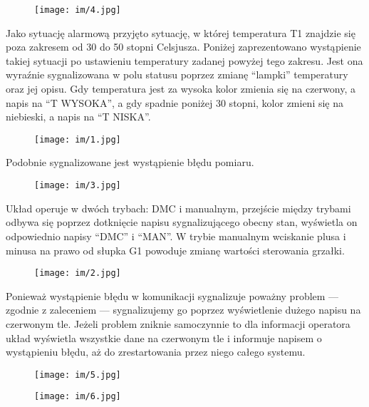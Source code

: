 \begin{figure}[H]
\centering
\texttt{[image: im/4.jpg]}
\label{R4}
\end{figure}


Jako sytuację alarmową przyjęto sytuację, w której temperatura T1 znajdzie się poza zakresem od 30 do 50 stopni Celsjusza. Poniżej zaprezentowano wystąpienie takiej sytuacji po ustawieniu temperatury zadanej powyżej tego zakresu. Jest ona wyraźnie sygnalizowana w polu statusu poprzez zmianę ``lampki'' temperatury oraz jej opisu. Gdy temperatura jest za wysoka kolor zmienia się na czerwony, a napis na ``T WYSOKA'', a gdy spadnie poniżej 30 stopni, kolor zmieni się na niebieski, a napis na ``T NISKA''.


\begin{figure}[H]
\centering
\texttt{[image: im/1.jpg]}
\label{R1}
\end{figure}


Podobnie sygnalizowane jest wystąpienie błędu pomiaru.


\begin{figure}[H]
\centering
\texttt{[image: im/3.jpg]}
\label{R3}
\end{figure}


Układ operuje w dwóch trybach: DMC i manualnym, przejście między trybami odbywa się poprzez dotknięcie napisu sygnalizującego obecny stan, wyświetla on odpowiednio napisy ``DMC'' i ``MAN''. W trybie manualnym wciskanie plusa i minusa na prawo od słupka G1 powoduje zmianę wartości sterowania grzałki.


\begin{figure}[H]
\centering
\texttt{[image: im/2.jpg]}
\label{R2}
\end{figure}


Ponieważ wystąpienie błędu w komunikacji sygnalizuje poważny problem --- zgodnie z zaleceniem --- sygnalizujemy go poprzez wyświetlenie dużego napisu na czerwonym tle. Jeżeli problem zniknie samoczynnie to dla informacji operatora układ wyświetla wszystkie dane na czerwonym tle i informuje napisem o wystąpieniu błędu, aż do zrestartowania przez niego całego systemu.


\begin{figure}[H]
\centering
\texttt{[image: im/5.jpg]}
\label{R5}
\end{figure}


\begin{figure}[H]
\centering
\texttt{[image: im/6.jpg]}
\label{R6}
\end{figure}

